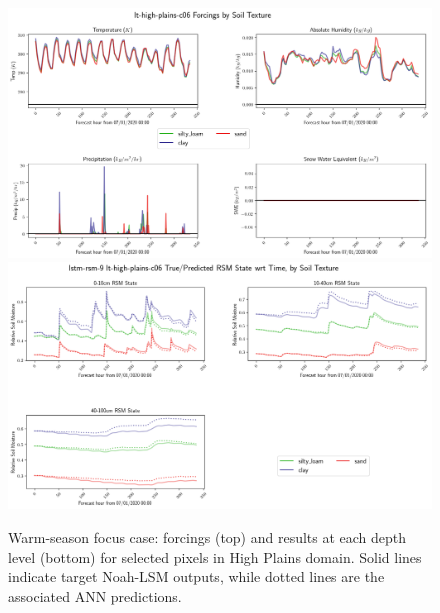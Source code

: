 \begin{figure}[h!p]
    \centering

    \includegraphics[width=.98\linewidth,draft=false]{figures/lt-high-plains/eval-grid_lt-high-plains-c06_lstm-rsm-9_rsm_keep-all_bias_forcings.png}
    \includegraphics[width=.98\linewidth,draft=false]{figures/lt-high-plains/eval-grid_lt-high-plains-c06_lstm-rsm-9_rsm_keep-all_bias_state-seq-textures-all.png}

    \caption{Warm-season focus case: forcings (top) and results at each depth level (bottom) for selected pixels in High Plains domain. Solid lines indicate target Noah-LSM outputs, while dotted lines are the associated ANN predictions.}
    \label{lt_sequence-c06_high-plains}
\end{figure}

